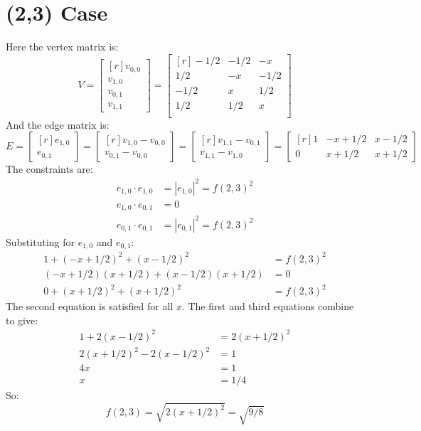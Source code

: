 \documentclass[12pt,titlepage]{article}
\begin{document}
\section{(2,3) Case}

Here the vertex matrix is:
\begin{equation*}
V =
\begin{bmatrix*}[r]
v_{0,0} \\
v_{1,0} \\
v_{0,1} \\
v_{1,1}
\end{bmatrix*}
=
\begin{bmatrix*}[r]
-1/2 & -1/2 &   -x \\
 1/2 &   -x & -1/2 \\
-1/2 &    x &  1/2 \\
 1/2 &  1/2 &    x \\
\end{bmatrix*}
\end{equation*}
And the edge matrix is:
\begin{equation*}
E =
\begin{bmatrix*}[r]
e_{1,0} \\
e_{0,1}
\end{bmatrix*}
=
\begin{bmatrix*}[r]
v_{1,0} - v_{0,0} \\
v_{0,1} - v_{0,0}
\end{bmatrix*}
=
\begin{bmatrix*}[r]
v_{1,1} - v_{0,1} \\
v_{1,1} - v_{1,0}
\end{bmatrix*}
=
\begin{bmatrix*}[r]
1 & -x + 1/2 & x - 1/2 \\
0 &  x + 1/2 & x + 1/2
\end{bmatrix*}
\end{equation*}
The constraints are:
\begin{align*}
e_{1,0} \cdot e_{1,0} &= |e_{1,0}|^2 = f(2,3)^2 \\
e_{1,0} \cdot e_{0,1} &= 0                      \\
e_{0,1} \cdot e_{0,1} &= |e_{0,1}|^2 = f(2,3)^2
\end{align*}
Substituting for $e_{1,0}$ and $e_{0,1}$:
\begin{align*}
1 + (-x + 1/2)^2 + (x - 1/2)^2           &= f(2,3)^2 \\
(-x + 1/2)(x + 1/2) + (x - 1/2)(x + 1/2) &= 0        \\
0 + (x + 1/2)^2 + (x + 1/2)^2            &= f(2,3)^2
\end{align*}
The second equation is satisfied for all $x$.  The first and third equations
combine to give:
\begin{align*}
1 + 2 (x - 1/2)^2             &= 2 (x + 1/2)^2 \\
2 (x + 1/2)^2 - 2 (x - 1/2)^2 &= 1             \\
4 x                           &= 1             \\
x                             &= 1/4
\end{align*}
So:
\begin{equation*}
f(2,3) = \sqrt{2 (x + 1/2)^2} = \sqrt{9/8}
\end{equation*}
\end{document}
